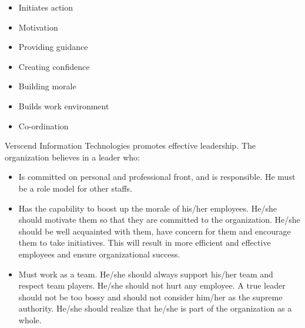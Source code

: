 \begin{itemize}
\item Initiates action
\item Motivation
\item Providing guidance
\item Creating confidence
\item Building morale
\item Builds work environment
\item Co-ordination
\end{itemize}
Verscend Information Technologies promotes effective leadership. The organization believes in a leader who:
\begin{itemize}
\item
Is committed on personal and professional front, and is responsible. He must be a role model for other
staffs.
\item
Has the capability to boost up the morale of his/her employees. He/she should motivate them so that
they are committed to the organization. He/she should be well acquainted with them, have concern for
them and encourage them to take initiatives. This will result in more efficient and effective employees
and ensure organizational success.
\item
Must work as a team. He/she should always support his/her team and respect team players. He/she
should not hurt any employee. A true leader should not be too bossy and should not consider him/her
as the supreme authority. He/she should realize that he/she is part of the organization as a whole.
\end{itemize}
\cleardoublepage
